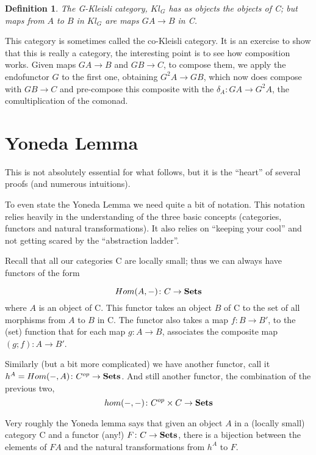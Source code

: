 \documentclass{article}
\newtheorem{definition}{Definition}
\begin{document}
\begin{definition}
The G-Kleisli category, $Kl_{G}$
has as
objects  the objects of C;
but 
maps from $A$ to $B$ in $Kl_{G}$
 are  maps $GA\to B$ in C.
\end{definition}
This category is sometimes called the co-Kleisli category.
It is an exercise to  show  that this is really a category, the interesting
point is to see how  composition works.
Given maps $GA\to B$ and $GB\to C$, to compose them, we apply the
endofunctor $G$ to the first one, obtaining $G^2A\to GB$, which now
does compose with $GB\to C$ and pre-compose this composite with the
$\delta_A\colon GA\to G^2A$,
the comultiplication of the comonad.
 
\section{Yoneda Lemma}
This is not absolutely essential for what follows, but it is the
``heart'' of several proofs (and numerous intuitions).

To even state the Yoneda Lemma we need quite a bit of notation. This
notation relies heavily in the understanding of the three basic
concepts (categories, functors and natural transformations). It also
relies on ``keeping your cool'' and not getting scared by the
``abstraction ladder''. 


Recall that all our categories C are locally small; thus
 we can always have  functors of the form

\[ Hom(A,-)\colon C\to {\bf Sets}\]
where $A$ is an object of C.
This functor takes an object $B$ of C to the set of all morphisms from
$A$ to $B$ in C. The functor also takes a map $f\colon B\to B'$, to
the (set) function that for each map $g\colon A\to B$, associates 
the composite map $(g;f)\colon A\to B'$.

Similarly (but a bit more complicated) we have another functor, call
it $h^A= Hom(-, A)\colon C^{op}\to {\bf Sets}$. And still another
functor, the combination of the previous two, 
\[ hom(-,-)\colon C^{op}\times C\to {\bf Sets}\]


Very roughly the Yoneda lemma says that given an object $A$ in a
(locally small) category C and a functor (any!)
$F\colon C\to {\bf Sets}$,
there is a bijection between the elements of $FA$ and the natural
transformations from $h^A$ to $F$.
\end{document}
